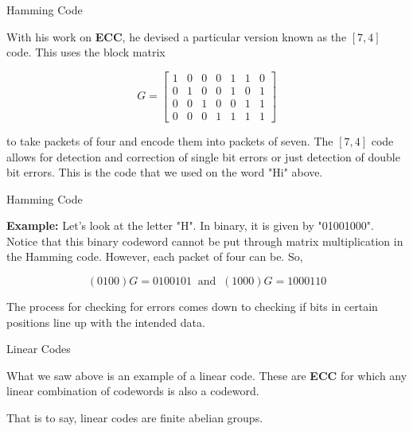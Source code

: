 \documentclass{beamer}
\begin{document}
\begin{frame}{Hamming Code}
    
    With his work on \textbf{ECC}, he devised a particular version known as the $[7,4]$ code. This uses
    the block matrix

    $$G=\left[\begin{array}{ccccccc}
        1 & 0 & 0 & 0 & 1 & 1 & 0 \\
        0 & 1 & 0 & 0 & 1 & 0 & 1 \\
        0 & 0 & 1 & 0 & 0 & 1 & 1 \\
        0 & 0 & 0 & 1 & 1 & 1 & 1
    \end{array}\right]$$

    to take packets of four and encode them into packets of seven. The $[7,4]$ code allows for detection
    and correction of single bit errors or just detection of double bit errors. This is the code that we
    used on the word "Hi" above.

\end{frame}

\begin{frame}{Hamming Code}
    
    \textbf{Example:} Let's look at the letter "H". In binary, it is given by
    "01001000". Notice that this binary codeword cannot be put through matrix multiplication in the
    Hamming code. However, each packet of four can be. So,

    $$(0 1 0 0)G=0100101\;\;\text{and}\;\; (1 0 0 0)G=1000110$$

    \bigskip

    \pause

    The process for checking for errors comes down to checking if bits in certain positions line up with
    the intended data.

\end{frame}

\begin{frame}{Linear Codes}
    
    What we saw above is an example of a linear code. These are \textbf{ECC} for which any linear
    combination of codewords is also a codeword.

    \bigskip

    That is to say, linear codes are finite abelian groups.

\end{frame}
\end{document}
